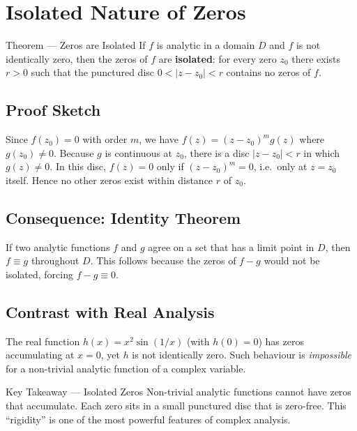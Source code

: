 \documentclass[12pt,a4paper]{article}
\begin{document}
\section{Isolated Nature of Zeros}

\begin{infobox}{Theorem --- Zeros are Isolated}
If $f$ is analytic in a domain $D$ and $f$ is not identically zero, then the zeros of $f$
are \textbf{isolated}: for every zero $z_0$ there exists $r > 0$ such that the punctured
disc $0 < |z - z_0| < r$ contains no zeros of $f$.
\end{infobox}

\subsection*{Proof Sketch}

Since $f(z_0)=0$ with order $m$, we have $f(z)=(z-z_0)^m g(z)$ where $g(z_0)\neq 0$.
Because $g$ is continuous at $z_0$, there is a disc $|z-z_0|<r$ in which $g(z)\neq 0$.
In this disc, $f(z)=0$ only if $(z-z_0)^m=0$, i.e.\ only at $z=z_0$ itself. Hence no
other zeros exist within distance $r$ of $z_0$.

\subsection*{Consequence: Identity Theorem}

If two analytic functions $f$ and $g$ agree on a set that has a limit point in $D$,
then $f \equiv g$ throughout $D$. This follows because the zeros of $f-g$ would not
be isolated, forcing $f-g \equiv 0$.

\subsection*{Contrast with Real Analysis}

The real function $h(x) = x^2 \sin(1/x)$ (with $h(0)=0$) has zeros accumulating at
$x=0$, yet $h$ is not identically zero. Such behaviour is \emph{impossible} for a
non-trivial analytic function of a complex variable.

\begin{learnbox}{Key Takeaway --- Isolated Zeros}
Non-trivial analytic functions cannot have zeros that accumulate. Each zero sits in a
small punctured disc that is zero-free. This ``rigidity'' is one of the most powerful
features of complex analysis.
\end{learnbox}
\end{document}
